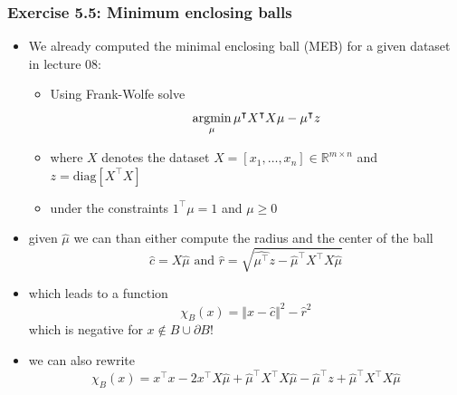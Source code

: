 \documentclass[10pt,aspectratio=169,handout]{beamer}
\begin{document}
\begin{frame}
    \frametitle{Exercise 5.5: Minimum enclosing balls}

    \begin{itemize}
        \item We already computed the minimal enclosing ball (MEB) for a given dataset in lecture 08:
        \begin{itemize}
            \item Using Frank-Wolfe solve \[\operatorname*{argmin}_{\mu} \mu^\intercal X^\intercal X\mu-\mu^\intercal z\]
            \item where $X$ denotes the dataset $X=[x_1,\dots,x_n]\in\mathbb{R}^{m\times n}$ and $z=\text{diag}[X^\intercal X]$
            \item under the constraints $1^\intercal\mu=1$ and $\mu\geq 0$
        \end{itemize}
        \item given $\hat{\mu}$ we can than either compute the radius and the center of the ball 
        \[\hat{c}=X\hat{\mu}\text{  and  } \hat{r}=\sqrt{\hat{\mu^\intercal}z-\hat{\mu}^\intercal X^\intercal X\hat{\mu}}\]
        \item which leads to a function \[\chi_B(x)=\Vert x-\hat{c}\Vert^2 -\hat{r}^2\] which is negative for $x\notin B\cup\partial B$!
        \item we can also rewrite \[\chi_B(x)=x^\intercal x-2x^\intercal X \hat{\mu}+\hat{\mu}^\intercal X^\intercal X \hat{\mu}-\hat{\mu}^\intercal z+\hat{\mu}^\intercal X^\intercal X\hat{\mu}\]
    \end{itemize}

\end{frame}
\end{document}
